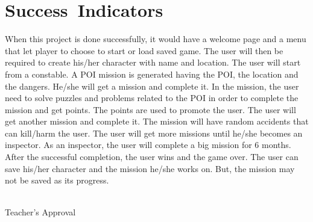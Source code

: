 \documentclass[letterpaper,12pt]{article}
\begin{document}
\section{Success\ Indicators}
    When this project is done successfully, it would have a welcome page and a menu that let player to choose to start or load saved game. The user will then be required to create his/her character with name and location. The user will start from a constable. A POI mission is generated having the POI, the location and the dangers. He/she will get a mission and complete it. In the mission, the user need to solve puzzles and problems related to the POI in order to complete the mission and get points. The points are used to promote the user. The user will get another mission and complete it. The mission will have random accidents that can kill/harm the user. The user will get more missions until he/she becomes an inspector. As an inspector, the user will complete a big mission for 6 months. After the successful completion, the user wins and the game over. The user can save his/her character and the mission he/she works on. But, the mission may not be saved as its progress.

	\vfill

	\begin{flushright}
		\makebox[2.5in]{\hrulefill}\\
		Teacher's Approval
	\end{flushright}
\end{document}
